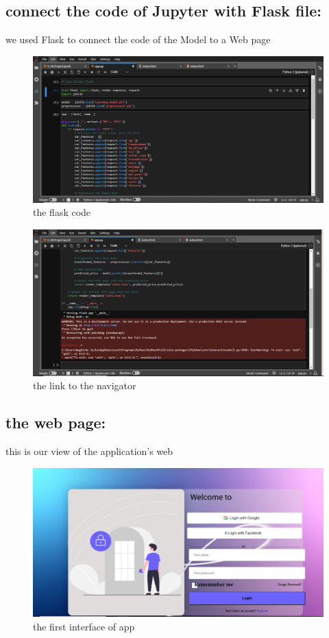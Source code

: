 \documentclass{article}
\begin{document}
\subsection{connect the code of Jupyter with Flask file:}
we used Flask to connect the code of the Model to a Web page
\begin{figure}[!h]
    \centering
    \includegraphics[width=1\textwidth]{flask1.png}
    \caption{the flask code}
    \label{fig:my_label}
\end{figure}
\begin{figure}[!h]
    \centering
    \includegraphics[width=1\textwidth]{flask2.png}
    \caption{the link to the navigator}
    \label{fig:my_label}
\end{figure}
\newpage
\subsection{the web page:}
this is our view of the application's web 
\begin{figure}[!h]
    \centering
    \includegraphics[width=1\textwidth]{input.png}
    \caption{the first interface of app}
    \label{fig:my_label}
\end{figure}
\end{document}
